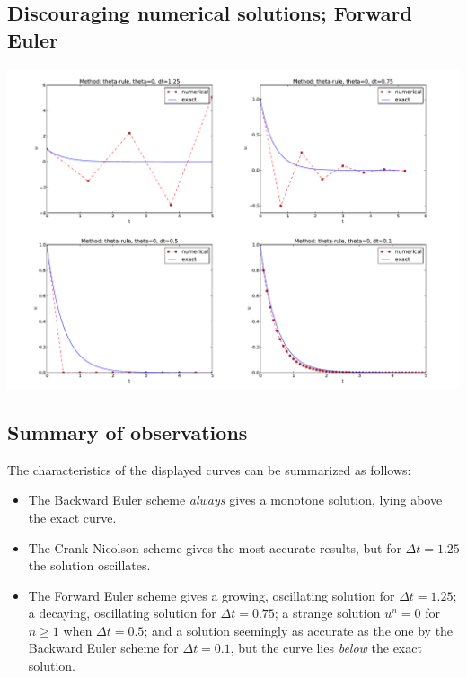 \documentclass[%
oneside,                 %
final,                   %
10pt]{article}
\begin{document}
\subsection*{Discouraging numerical solutions; Forward Euler}



\centerline{\includegraphics[width=1.1\linewidth]{fig-analysis/FE4c.pdf}}



\subsection*{Summary of observations}

The characteristics of the displayed curves can be summarized as follows:

\begin{itemize}
  \item The Backward Euler scheme \emph{always} gives a monotone solution, lying above
    the exact curve.

  \item The Crank-Nicolson scheme gives the most accurate results, but for
    $\Delta t=1.25$ the solution oscillates.

  \item The Forward Euler scheme gives a growing, oscillating solution for
    $\Delta t=1.25$; a decaying, oscillating solution for $\Delta t=0.75$;
    a strange solution $u^n=0$ for $n\geq 1$ when $\Delta t=0.5$; and
    a solution seemingly as accurate as the one by the Backward Euler
    scheme for $\Delta t = 0.1$, but the curve lies \emph{below} the exact
    solution.
\end{itemize}
\end{document}
